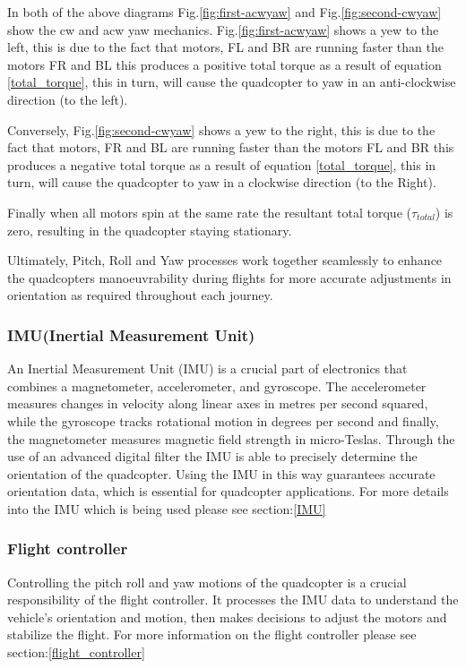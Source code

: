 \documentclass{article}
\begin{document}
In both of the above diagrams Fig.\ref{fig:first-acwyaw} and Fig.\ref{fig:second-cwyaw} show the cw and acw yaw mechanics. Fig.\ref{fig:first-acwyaw} shows a yew to the left, this is due to the fact that motors, FL and BR are running faster than the motors FR and BL this produces 
a positive total torque as a result of equation \ref{total_torque}, this in turn,  will cause the quadcopter to yaw in an anti-clockwise direction (to the left).

Conversely, Fig.\ref{fig:second-cwyaw}  shows a yew to the right, this is due to the fact that motors, FR and BL are running faster than the motors FL and BR this produces 
a negative total torque as a result of equation \ref{total_torque}, this in turn,  will cause the quadcopter to yaw in a clockwise direction (to the Right).

Finally when all motors spin at the same rate the resultant total torque (\(\tau_{total}\)) is zero, resulting in the quadcopter staying stationary.


Ultimately, Pitch, Roll and Yaw processes work together seamlessly to enhance the quadcopters manoeuvrability during flights for more accurate adjustments in orientation as required throughout each journey.

\subsubsection{IMU(Inertial Measurement Unit)}
An Inertial Measurement Unit (IMU) is a crucial part of electronics that combines a magnetometer, accelerometer, and gyroscope. The accelerometer measures changes in velocity along linear axes in metres per second squared, while the gyroscope tracks rotational motion in degrees per second and finally, the magnetometer 
measures magnetic field strength in micro-Teslas. Through the use of an advanced digital filter the IMU is able to precisely determine the orientation of the quadcopter. Using the IMU in this way guarantees accurate orientation data, which is essential for quadcopter applications. For more details into the IMU which 
is being used please see section:\ref{IMU}

\subsubsection{Flight controller}
Controlling the pitch roll and yaw motions of the quadcopter is a crucial responsibility of the flight controller. It processes the IMU data to understand the vehicle's orientation and motion, then makes decisions to adjust the motors and stabilize the flight. For more information on the flight controller please see section:\ref{flight_controller}
\end{document}
